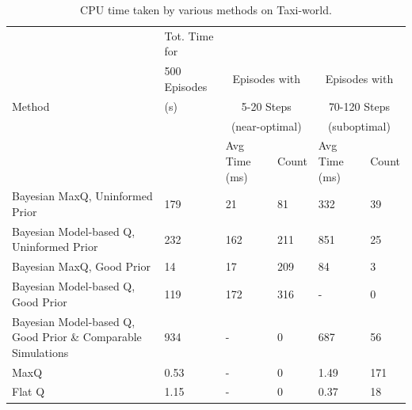 \label{sec:expts}
\begin{table}[t]
\caption{CPU time taken by various methods on {\sf Taxi-world}.}
\label{tab:time}
\begin{center}
\begin{tabular}{| p{4cm} | l | l | l | l | l |}
\hline
\multirow{5}{*}{Method} 	&Tot. Time  for	&\multicolumn{2}{|c|}{}  &\multicolumn{2}{|c|}{}			\\ 
						&500 Episodes 	&\multicolumn{2}{|c|}{Episodes with} 	 &\multicolumn{2}{|c|}{Episodes with}			\\
						&(s)				&\multicolumn{2}{|c|}{5-20 Steps}	&\multicolumn{2}{|c|}{70-120 Steps} 		\\ 
						&				&\multicolumn{2}{|c|}{(near-optimal)}		&\multicolumn{2}{|c|}{(suboptimal)}				\\ \cline{3-6}
						&
                                                &Avg Time (ms)	&Count
                                                &Avg Time (ms)	&Count \\ \hline
						
Bayesian MaxQ, Uninformed Prior	&179	&21		&81 		&332  	&39 				\\ \hline
Bayesian Model-based Q, Uninformed Prior	&232	&162 	&211 	&851	&25 					\\ \hline
Bayesian MaxQ, Good Prior		&14		&17 		&209 	&84 		&3 				\\ \hline
Bayesian Model-based Q, Good Prior		&119	&172 	&316 	&- 		&0 				\\ \hline
Bayesian Model-based Q, Good Prior \& Comparable Simulations 									&934	&- 		&0		&687	&56		\\ \hline
MaxQ							&0.53	&- 		&0		&1.49 	&171				\\ \hline
Flat Q							&1.15	&- 		&0		&0.37	&18			\\ \hline
\end{tabular}
\end{center}
\end{table}
